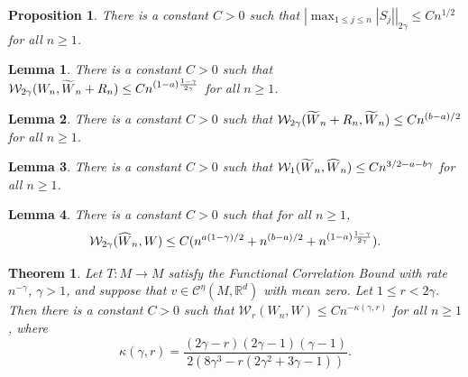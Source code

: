 \documentclass[10pt,a4paper]{amsart}
\newtheorem{theorem}{Theorem}
\newtheorem{lemma}{Lemma}
\newtheorem{prop}{Proposition}
\newcommand{\R}{\ensuremath{\mathbb{R}}}%
\newcommand{\holsp}[1][\eta]{\mathcal{C}^{#1}}
\newcommand{\kant}{\wass_1}
\newcommand{\pnorm}[1]{\left|#1\right|}
\newcommand{\shat}[1]{\vphantom{#1}\smash[t]{\widehat{#1}}}
\newcommand{\stilde}[1]{\vphantom{#1}\smash[t]{\widetilde{#1}}}
\newcommand{\wass}{\mathcal{W}}
\begin{document}
	\begin{prop}\label{prop:maximal_ineq_birkhoff}
		There is a constant $ C>0 $ such that 
		$ \pnorm{\max_{1\le j\le n}|S_j|}_{2\gamma}\le Cn^{1/2}$ for all $n\ge 1$.
	\end{prop}

\begin{lemma}\label{lemma:blocking_step_error}There is a constant $ C>0 $ such that 
		$ \wass_{2\gamma}(W_n, \stilde W_n+R_n)\le Cn^{(1-a)\frac{1-\gamma}{2\gamma}} $ for all $ n\ge 1 $.
	\end{lemma}

\begin{lemma}\label{lem:small_blocks_negligible}
	There is a constant $C>0$ such that $\wass_{2\gamma}(\stilde W_n+R_n, \stilde W_n)\le Cn^{(b-a)/2}$ for all $n\ge 1$.
\end{lemma}

	\begin{lemma}\label{lemma:big_block_indep_approx}
		There is a constant $C>0$ such that $\kant(\stilde W_n, \shat W_n)\le Cn^{3/2-a-b\gamma}$ for all $n\ge 1$.
	\end{lemma}

	\begin{lemma}\label{lemma:approx_indep_big_blocks_bm}
		There is a constant $ C>0 $ such that for all $ n\ge 1 $,
		\[ \wass_{2\gamma}(\shat W_n,W) \le C(n^{a(1-\gamma)/2}+ n^{(b-a)/2}+n^{(1-a)\frac{1-\gamma}{2\gamma}}). \]
	\end{lemma}

\begin{theorem}\label{thm:rates_wip_lip}
	Let $ T:M\to M $ satisfy the Functional Correlation Bound with rate $ n^{-\gamma} $, $ \gamma>1 $, and suppose that $ v\in \holsp(M,\R^d)$ with mean zero. Let $1\le r<2\gamma$. Then there is a constant $ C>0 $ such that $ \wass_r(W_n,W)\le Cn^{-\kappa(\gamma,r)} $ for all $ n\ge 1 $, where 
	\begin{equation*}
		\kappa(\gamma,r)=\frac{(2\gamma-r)(2\gamma-1)(\gamma-1)}{2(8\gamma^3 - r(2\gamma^2 + 3\gamma - 1))}.
	\end{equation*}
\end{theorem}
\end{document}
